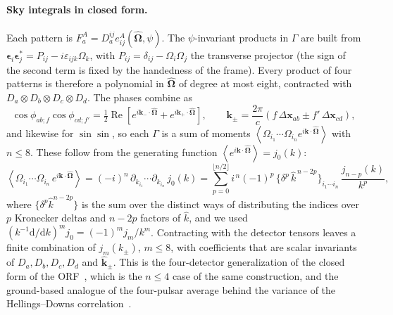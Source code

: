 \documentclass[11pt]{article}
\newcommand{\avg}[1]{\left\langle #1 \right\rangle}
\renewcommand{\Re}{\operatorname{Re}}
\newcommand{\bOmega}{\hat{\bm{\Omega}}}
\theoremstyle{remark}
\begin{document}
\paragraph{Sky integrals in closed form.}
Each pattern is $F_a^A = D_a^{ij} e^A_{ij}(\bOmega,\psi)$. The
$\psi$-invariant products in $\Gamma$ are built from
$\bm\epsilon_i\bm\epsilon_j^* = P_{ij} - i\varepsilon_{ijk}\Omega_k$, with
$P_{ij} = \delta_{ij} - \Omega_i\Omega_j$ the transverse projector (the sign of
the second term is fixed by the handedness of the frame). Every product of four
patterns is therefore a polynomial in $\bOmega$ of degree at most eight,
contracted with $D_a\otimes D_b\otimes D_c\otimes D_d$. The phases combine as
\begin{equation}
  \cos\phi_{ab;f}\cos\phi_{cd;f'}
  = \tfrac12\Re\!\left[e^{i\bm k_-\cdot\bOmega} + e^{i\bm k_+\cdot\bOmega}\right],
  \qquad
  \bm k_\pm = \frac{2\pi}{c}\left(f\,\Delta\bm x_{ab} \pm f'\,\Delta\bm x_{cd}\right),
\end{equation}
and likewise for $\sin\sin$, so each $\Gamma$ is a sum of moments
$\avg{\Omega_{i_1}\cdots\Omega_{i_n} e^{i\bm k\cdot\bOmega}}$ with $n\le8$. These
follow from the generating function
$\avg{e^{i\bm k\cdot\bOmega}} = j_0(k)$:
\begin{equation}
  \avg{\Omega_{i_1}\cdots\Omega_{i_n}\, e^{i\bm k\cdot\bOmega}}
  = (-i)^n\, \partial_{k_{i_1}}\cdots\partial_{k_{i_n}}\, j_0(k)
  = \sum_{p=0}^{\lfloor n/2\rfloor} i^{\,n} (-1)^{p}\,
    \big\{\delta^{p}\,\hat k^{\,n-2p}\big\}_{i_1\cdots i_n}\,
    \frac{j_{n-p}(k)}{k^{p}},
  \label{eq:moments}
\end{equation}
where $\{\delta^p\hat k^{n-2p}\}$ is the sum over the distinct ways of
distributing the indices over $p$ Kronecker deltas and $n-2p$ factors of
$\hat k$, and we used $(k^{-1}\mathrm d/\mathrm dk)^m j_0 = (-1)^m j_m / k^m$.
Contracting with the detector tensors leaves a finite combination of
$j_m(k_\pm)$, $m\le 8$, with coefficients that are scalar invariants of
$D_a, D_b, D_c, D_d$ and $\hat{\bm k}_\pm$. This is the four-detector
generalization of the closed form of the ORF~\cite{Flanagan1993}, which is the
$n\le4$ case of the same construction, and the ground-based analogue of the
four-pulsar average behind the variance of the Hellings--Downs
correlation~\cite{Allen2023}.
\end{document}
